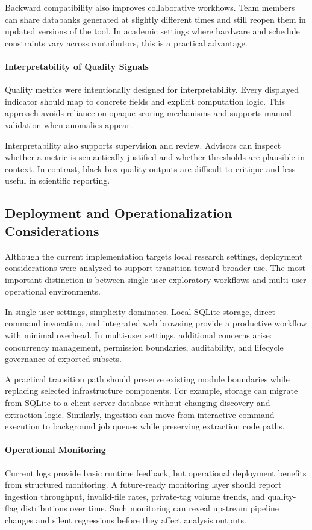 Backward compatibility also improves collaborative workflows. Team members can share databanks generated at slightly different times and still reopen them in updated versions of the tool. In academic settings where hardware and schedule constraints vary across contributors, this is a practical advantage.

\paragraph{Interpretability of Quality Signals}
Quality metrics were intentionally designed for interpretability. Every displayed indicator should map to concrete fields and explicit computation logic. This approach avoids reliance on opaque scoring mechanisms and supports manual validation when anomalies appear.

Interpretability also supports supervision and review. Advisors can inspect whether a metric is semantically justified and whether thresholds are plausible in context. In contrast, black-box quality outputs are difficult to critique and less useful in scientific reporting.

\subsection{Deployment and Operationalization Considerations}
Although the current implementation targets local research settings, deployment considerations were analyzed to support transition toward broader use. The most important distinction is between single-user exploratory workflows and multi-user operational environments.

In single-user settings, simplicity dominates. Local SQLite storage, direct command invocation, and integrated web browsing provide a productive workflow with minimal overhead. In multi-user settings, additional concerns arise: concurrency management, permission boundaries, auditability, and lifecycle governance of exported subsets.

A practical transition path should preserve existing module boundaries while replacing selected infrastructure components. For example, storage can migrate from SQLite to a client-server database without changing discovery and extraction logic. Similarly, ingestion can move from interactive command execution to background job queues while preserving extraction code paths.

\paragraph{Operational Monitoring}
Current logs provide basic runtime feedback, but operational deployment benefits from structured monitoring. A future-ready monitoring layer should report ingestion throughput, invalid-file rates, private-tag volume trends, and quality-flag distributions over time. Such monitoring can reveal upstream pipeline changes and silent regressions before they affect analysis outputs.

